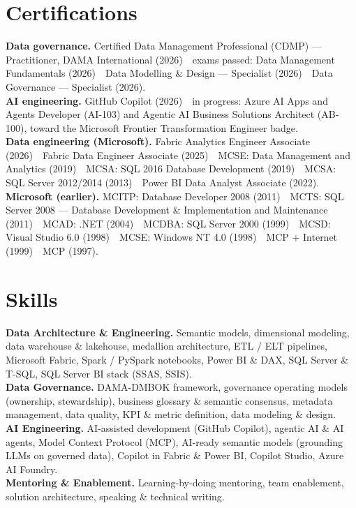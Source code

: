 \documentclass[10.5pt]{article}
\newcommand{\hsep}{\ \raisebox{0.5pt}{\scriptsize\textbullet}\ }
\begin{document}
\section{Certifications}
\textbf{Data governance.} Certified Data Management Professional (CDMP) --- Practitioner, DAMA International (2026)\hsep exams passed: Data Management Fundamentals (2026)\hsep Data Modelling \& Design --- Specialist (2026)\hsep Data Governance --- Specialist (2026).\\[3pt]
\textbf{AI engineering.} GitHub Copilot (2026)\hsep in progress: Azure AI Apps and Agents Developer (AI-103) and Agentic AI Business Solutions Architect (AB-100), toward the Microsoft Frontier Transformation Engineer badge.\\[3pt]
\textbf{Data engineering (Microsoft).} Fabric Analytics Engineer Associate (2026)\hsep Fabric Data Engineer Associate (2025)\hsep MCSE: Data Management and Analytics (2019)\hsep MCSA: SQL 2016 Database Development (2019)\hsep MCSA: SQL Server 2012/2014 (2013)\hsep Power BI Data Analyst Associate (2022).\\[3pt]
\textbf{Microsoft (earlier).} MCITP: Database Developer 2008 (2011)\hsep MCTS: SQL Server 2008 --- Database Development \& Implementation and Maintenance (2011)\hsep MCAD: .NET (2004)\hsep MCDBA: SQL Server 2000 (1999)\hsep MCSD: Visual Studio 6.0 (1998)\hsep MCSE: Windows NT 4.0 (1998)\hsep MCP + Internet (1999)\hsep MCP (1997).

\section{Skills}
\textbf{Data Architecture \& Engineering.} Semantic models, dimensional modeling, data warehouse \& lakehouse, medallion architecture, ETL / ELT pipelines, Microsoft Fabric, Spark / PySpark notebooks, Power BI \& DAX, SQL Server \& T-SQL, SQL Server BI stack (SSAS, SSIS).\\[3pt]
\textbf{Data Governance.} DAMA-DMBOK framework, governance operating models (ownership, stewardship), business glossary \& semantic consensus, metadata management, data quality, KPI \& metric definition, data modeling \& design.\\[3pt]
\textbf{AI Engineering.} AI-assisted development (GitHub Copilot), agentic AI \& AI agents, Model Context Protocol (MCP), AI-ready semantic models (grounding LLMs on governed data), Copilot in Fabric \& Power BI, Copilot Studio, Azure AI Foundry.\\[3pt]
\textbf{Mentoring \& Enablement.} Learning-by-doing mentoring, team enablement, solution architecture, speaking \& technical writing.
\end{document}
